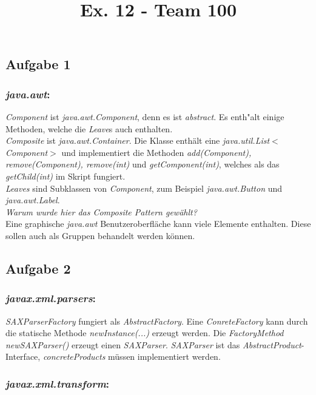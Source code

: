 \documentclass[a4paper]{article}
\title{Ex. 12 - Team 100}
\begin{document}
	\maketitle
\subsection*{Aufgabe 1}
\subsubsection*{\textit{java.awt}:}
\textit{Component} ist \textit{java.awt.Component}, denn es ist \textit{abstract}. Es enth"alt einige Methoden, welche die \textit{Leave}s auch enthalten. \\
\textit{Composite} ist \textit{java.awt.Container}. Die Klasse enthält eine \textit{java.util.List}$<$\textit{Component}$>$ und implementiert die 
Methoden \textit{add(Component), remove(Component), remove(int)} und \textit{getComponent(int)}, welches als das \textit{getChild(int)} im Skript fungiert. \\
\textit{Leaves} sind Subklassen von \textit{Component}, zum Beispiel \textit{java.awt.Button} und \textit{java.awt.Label}.\\
\emph{Warum wurde hier das \textit{Composite Pattern} gewählt?} \\
Eine graphische \textit{java.awt} Benutzeroberfläche kann viele Elemente enthalten. Diese sollen auch als Gruppen behandelt werden können.
\subsection*{Aufgabe 2}
	\subsubsection*{\textit{javax.xml.parsers}:}
	
	\textit{SAXParserFactory} fungiert als \textit{AbstractFactory}. 
	Eine \textit{ConreteFactory} kann durch die statische Methode \textit{newInstance(...)} erzeugt werden.
	Die \textit{FactoryMethod newSAXParser()} erzeugt einen \textit{SAXParser}. \textit{SAXParser} ist das \textit{AbstractProduct}-Interface, 
	\textit{concreteProducts} müssen implementiert werden.
	
	\subsubsection*{\textit{javax.xml.transform}:} 
	
\end{document}

